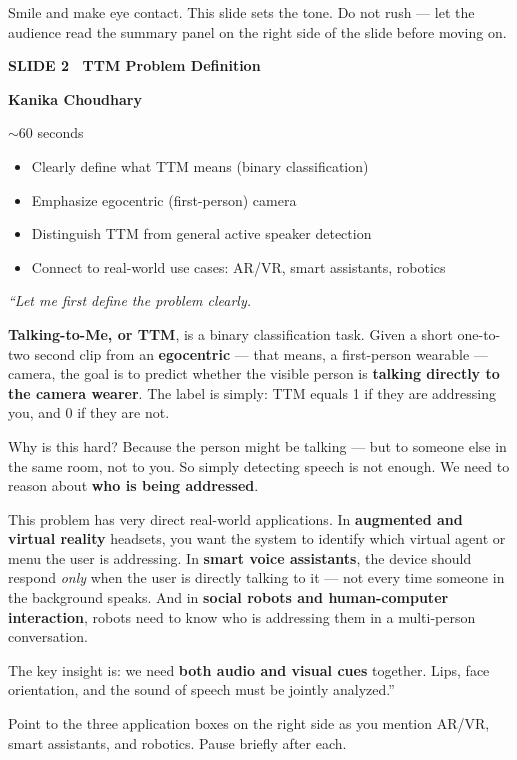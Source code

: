 \documentclass[11pt, a4paper]{article}
\newcommand{\slideheading}[3]{%
  \vspace{0.6cm}
  \begin{tcolorbox}[slidebox]
    \textbf{\color{NavyBlue}SLIDE #1 \textemdash\ #2}\\[2pt]
    \begin{tcolorbox}[presenterbox, title=Presenter(s)]
      \color{AccBlue}\bfseries #3
    \end{tcolorbox}
  \end{tcolorbox}
}
\newcommand{\timing}[1]{%
  \begin{tcolorbox}[timebox, title=Suggested Time]
    \color{AccOrange} #1
  \end{tcolorbox}
}
\newcommand{\keypoints}[1]{%
  \begin{tcolorbox}[keybox, title=Key Points to Cover]
    #1
  \end{tcolorbox}
}
\newcommand{\script}[1]{%
  \begin{mdframed}[
    backgroundcolor=white,
    linecolor=MidText!40,
    linewidth=0.5pt,
    leftmargin=0pt,
    rightmargin=0pt,
    innerleftmargin=10pt,
    innerrightmargin=8pt,
    innertopmargin=8pt,
    innerbottommargin=8pt,
    roundcorner=3pt
  ]
  \itshape\color{MidText}
  #1
  \end{mdframed}
}
\newcommand{\tip}[1]{%
  \begin{tcolorbox}[tipbox, title=Presenter Tip]
    #1
  \end{tcolorbox}
}
\begin{document}
\tip{Smile and make eye contact. This slide sets the tone. Do not rush --- let the audience read the summary panel on the right side of the slide before moving on.}

\slideheading{2}{TTM Problem Definition}{Kanika Choudhary}

\timing{$\sim$60 seconds}

\keypoints{%
\begin{itemize}[leftmargin=*, itemsep=2pt]
  \item Clearly define what TTM means (binary classification)
  \item Emphasize egocentric (first-person) camera
  \item Distinguish TTM from general active speaker detection
  \item Connect to real-world use cases: AR/VR, smart assistants, robotics
\end{itemize}
}

\script{%
``Let me first define the problem clearly.

\textbf{Talking-to-Me, or TTM}, is a binary classification task. Given a short one-to-two second clip from an \textbf{egocentric} --- that means, a first-person wearable --- camera, the goal is to predict whether the visible person is \textbf{talking directly to the camera wearer}. The label is simply: TTM equals 1 if they are addressing you, and 0 if they are not.

Why is this hard? Because the person might be talking --- but to someone else in the same room, not to you. So simply detecting speech is not enough. We need to reason about \textbf{who is being addressed}.

This problem has very direct real-world applications. In \textbf{augmented and virtual reality} headsets, you want the system to identify which virtual agent or menu the user is addressing. In \textbf{smart voice assistants}, the device should respond \textit{only} when the user is directly talking to it --- not every time someone in the background speaks. And in \textbf{social robots and human-computer interaction}, robots need to know who is addressing them in a multi-person conversation.

The key insight is: we need \textbf{both audio and visual cues} together. Lips, face orientation, and the sound of speech must be jointly analyzed.''
}

\tip{Point to the three application boxes on the right side as you mention AR/VR, smart assistants, and robotics. Pause briefly after each.}
\end{document}

